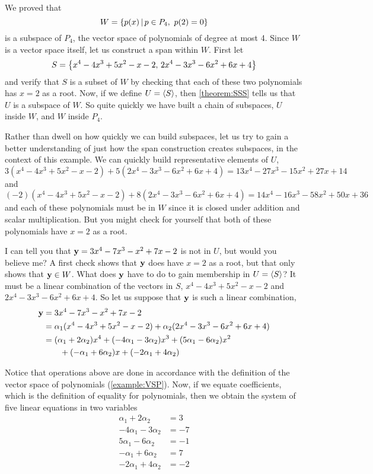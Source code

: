 \documentclass{ximera}
\begin{document}
\begin{example}

  We proved that
  \[
    W=\left\lbrace p(x)\,\middle|\,p\in P_4,\ p(2)=0\right\rbrace
  \]
  is a subspace of $P_4$, the vector space of polynomials of degree at
  most 4.  Since $W$ is a vector space itself, let us construct a span
  within $W$.  First let
  \[
    S=\left\{x^4-4x^3+5x^2-x-2,\,2x^4-3x^3-6x^2+6x+4\right\}
  \]
  and verify that $S$ is a subset of $W$ by checking that each of
  these two polynomials has $x=2$ as a root.  Now, if we define
  $U=\left\langle S\right\rangle$, then \ref{theorem:SSS} tells us that $U$ is a subspace
  of $W$.  So quite quickly we have built a chain of subspaces, $U$
  inside $W$, and $W$ inside $P_4$.

  Rather than dwell on how quickly we can build subspaces, let us try
  to gain a better understanding of just how the span construction
  creates subspaces, in the context of this example.  We can quickly
  build representative elements of $U$,
  \[
    3(x^4-4x^3+5x^2-x-2)+5(2x^4-3x^3-6x^2+6x+4)=13x^4-27x^3-15x^2+27x+14
  \]
  and
  \[
    (-2)(x^4-4x^3+5x^2-x-2)+8(2x^4-3x^3-6x^2+6x+4)=14x^4-16x^3-58x^2+50x+36
  \]
  and each of these polynomials must be in $W$ since it is closed
  under addition and scalar multiplication.  But you might check for
  yourself that both of these polynomials have $x=2$ as a root.

  I can tell you that $\mathbf{y}=3x^4-7x^3-x^2+7x-2$ is not in $U$, but
  would you believe me?  A first check shows that $\mathbf{y}$ does have
  $x=2$ as a root, but that only shows that $\mathbf{y}\in W$.  What
  does $\mathbf{y}$ have to do to gain membership in $U=\left\langle S\right\rangle$?  It
  must be a linear combination of the vectors in $S$,
  $x^4-4x^3+5x^2-x-2$ and $2x^4-3x^3-6x^2+6x+4$.  So let us suppose
  that $\mathbf{y}$ is such a linear combination,
  \begin{align*}
    \mathbf{y}
    &=3x^4-7x^3-x^2+7x-2\\
    &=\alpha_1(x^4-4x^3+5x^2-x-2)+\alpha_2(2x^4-3x^3-6x^2+6x+4)\\
    &=
      (\alpha_1+2\alpha_2)x^4+
      (-4\alpha_1-3\alpha_2)x^3+
      (5\alpha_1-6\alpha_2)x^2\\
    &\quad\quad+
      (-\alpha_1+6\alpha_2)x+
      (-2\alpha_1+4\alpha_2)
  \end{align*}
  
  Notice that operations above are done in accordance with the
  definition of the vector space of polynomials (\ref{example:VSP}).
  Now, if we equate coefficients, which is the definition of equality
  for polynomials, then we obtain the system of five linear equations
  in two variables
  \begin{align*}
    \alpha_1+2\alpha_2&=3\\
    -4\alpha_1-3\alpha_2&=-7\\
    5\alpha_1-6\alpha_2&=-1\\
    -\alpha_1+6\alpha_2&=7\\
    -2\alpha_1+4\alpha_2&=-2
  \end{align*}
  

\end{example}
\end{document}
